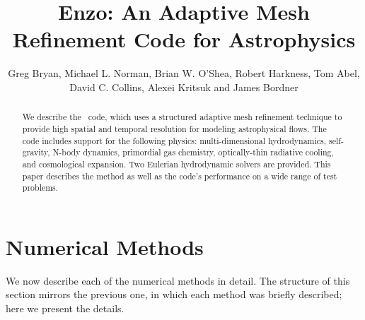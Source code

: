 \documentclass[onecolumn]{emulateapj}  %
\begin{document}
\title{Enzo: An Adaptive Mesh Refinement Code for Astrophysics}
\author{Greg Bryan, Michael L. Norman, 
Brian W. O'Shea, Robert Harkness, Tom Abel,
David C. Collins, 
Alexei Kritsuk and James Bordner }


\begin{abstract}
We describe the \enzo\ code, which uses a structured adaptive mesh refinement technique to provide high spatial and temporal resolution for modeling astrophysical flows.  The code includes support for the following physics: multi-dimensional hydrodynamics, self-gravity, N-body dynamics, primordial gas chemistry, optically-thin radiative cooling, and cosmological expansion.  Two Eulerian hydrodynamic solvers are provided.  This paper describes the method as well as the code's performance on a wide range of test problems.
\end{abstract}


\maketitle





\section{Numerical Methods}
\label{sec.methods}

We now describe each of the numerical methods in detail.  The structure of this section mirrors the previous one, in which each method was briefly described; here we present the details.
\end{document}
